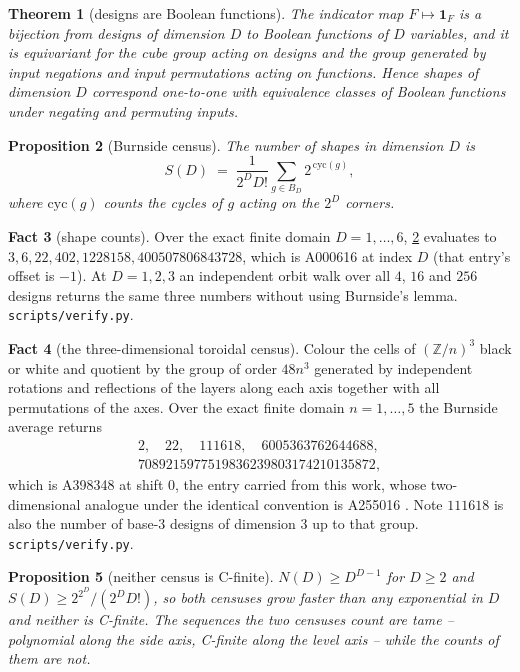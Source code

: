 \documentclass[11pt]{amsart}
\newtheorem{theorem}{Theorem}[section]
\newtheorem{proposition}[theorem]{Proposition}
\theoremstyle{definition}
\newtheorem{fact}[theorem]{Fact}
\theoremstyle{remark}
\begin{document}
\begin{theorem}[designs are Boolean functions]
\label{thm:bool}
The indicator map $F \mapsto \mathbf{1}_{F}$ is a bijection from designs of dimension $D$ to Boolean functions of $D$ variables, and it is equivariant for the cube group acting on designs and the group generated by input negations and input permutations acting on functions. Hence shapes of dimension $D$ correspond one-to-one with equivalence classes of Boolean functions under negating and permuting inputs.
\end{theorem}

\begin{proposition}[Burnside census]
\label{prop:burnside}
The number of shapes in dimension $D$ is
\[
  S(D) \;=\; \frac{1}{2^{D}D!}\sum_{g \in B_{D}} 2^{\,\mathrm{cyc}(g)},
\]
where $\mathrm{cyc}(g)$ counts the cycles of $g$ acting on the $2^{D}$ corners.
\end{proposition}

\begin{fact}[shape counts]
\label{fact:shapes}
Over the exact finite domain $D = 1,\dots,6$, \cref{prop:burnside} evaluates to $3, 6, 22, 402, 1228158, 400507806843728$, which is A000616 at index $D$ (that entry's offset is $-1$). At $D = 1,2,3$ an independent orbit walk over all $4$, $16$ and $256$ designs returns the same three numbers without using Burnside's lemma. \texttt{scripts/\allowbreak verify.py}.
\end{fact}

\begin{fact}[the three-dimensional toroidal census]
\label{fact:torus}
Colour the cells of $(\mathbb{Z}/n)^{3}$ black or white and quotient by the group of order $48n^{3}$ generated by independent rotations and reflections of the layers along each axis together with all permutations of the axes. Over the exact finite domain $n = 1,\dots,5$ the Burnside average returns
\begin{gather*}
  2,\quad 22,\quad 111618,\quad 6005363762644688,\\
  7089215977519836239803174210135872,
\end{gather*}
which is A398348 \cite{a398348} at shift $0$, the entry carried from this work, whose two-dimensional analogue under the identical convention is A255016 \cite{a255016}. Note $111618$ is also the number of base-$3$ designs of dimension $3$ up to that group. \texttt{scripts/\allowbreak verify.py}.
\end{fact}

\begin{proposition}[neither census is C-finite]
\label{prop:notcfinite}
$N(D) \ge D^{D-1}$ for $D \ge 2$ and $S(D) \ge 2^{2^{D}}/(2^{D}D!)$, so both censuses grow faster than any exponential in $D$ and neither is C-finite. The sequences the two censuses count are tame -- polynomial along the side axis, C-finite along the level axis -- while the counts of them are not.
\end{proposition}
\end{document}
